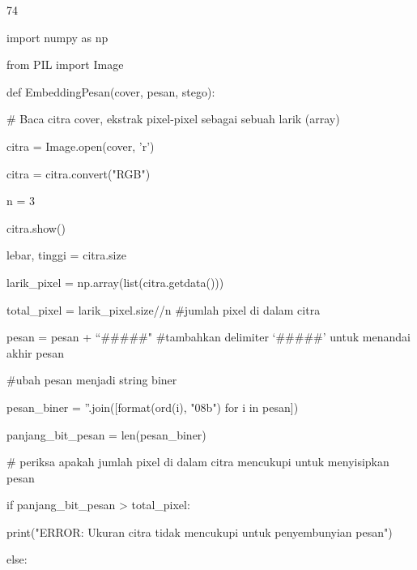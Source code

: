 \documentclass{article}
\begin{document}

74

import numpy as np

from PIL import Image

def EmbeddingPesan(cover, pesan, stego):       

 \# Baca citra cover, ekstrak pixel-pixel sebagai sebuah  larik (array)  

 citra = Image.open(cover, 'r’) 

 citra = citra.convert("RGB")

 n = 3    

 citra.show()   

 lebar, tinggi = citra.size   

 larik\_pixel = np.array(list(citra.getdata()))   

 total\_pixel = larik\_pixel.size//n     \#jumlah pixel di dalam citra     

 pesan = pesan + “\#\#\#\#\#"   \#tambahkan delimiter ‘\#\#\#\#\#’ untuk menandai akhir pesan

 \#ubah pesan menjadi string biner  

 pesan\_biner = ''.join([format(ord(i), "08b") for i in pesan])

 panjang\_bit\_pesan = len(pesan\_biner) 

 \# periksa apakah jumlah pixel di dalam citra mencukupi untuk menyisipkan pesan   

 if panjang\_bit\_pesan > total\_pixel:     

    print("ERROR: Ukuran citra tidak mencukupi untuk penyembunyian pesan")    

 else:
\end{document}
